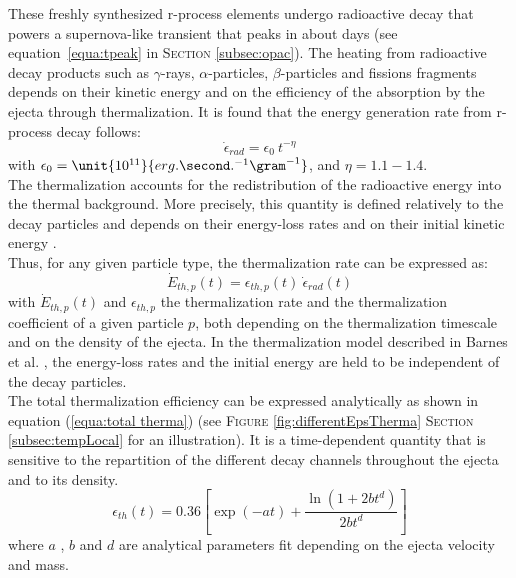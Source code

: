 \documentclass[a4paper, twoside, 11pt]{article}
\numberwithin{equation}{section}
\begin{document}
These freshly synthesized r-process elements undergo radioactive decay that powers a supernova-like transient that peaks in about days (see equation~\eqref{equa:tpeak} in S\textsc{ection} \ref{subsec:opac}). The heating from radioactive decay products such as $\gamma$-rays, $\alpha$-particles, $\beta$-particles and fissions fragments depends on their kinetic energy and on the efficiency of the absorption by the ejecta through thermalization. It is found that the energy generation rate from r-process decay follows\cite{Barnes_2016}: 
\begin{equation}
\dot{\epsilon}_{rad}= \epsilon_0\ t^{-\eta}
\label{equa:HeatingRate}
\end{equation} 
with \( \epsilon_0= \unit{10^{11}}{erg.\second.^{-1}\gram^{-1}}\), and \( \eta = 1.1-1.4\). \\

The thermalization  accounts for the redistribution of the radioactive energy into the thermal background. More precisely,  this quantity is defined relatively to the decay particles and  depends on their energy-loss rates and on their initial kinetic energy .\\

Thus, for any given particle type,  the thermalization rate can be expressed as: 
\begin{equation}
\dot{E}_{th,p}(t) = \epsilon_{th,p} (t) \  \dot{\epsilon}_{rad}(t)
\end{equation} 
with \( \dot{E}_{th,p}(t) \)  and \( \epsilon_{th,p}\) the thermalization rate and the thermalization coefficient of a given particle $p$, both depending on the thermalization timescale and on the density of the ejecta. In the thermalization model described in Barnes et al. \cite{Barnes_2016}, the energy-loss rates and the initial energy are held to be independent  of  the decay particles. \\

The total thermalization efficiency can be expressed analytically as shown in equation (\ref{equa:total therma}) (see  F\textsc{igure} \ref{fig:differentEpsTherma} S\textsc{ection} \ref{subsec:tempLocal} for an illustration).  It is a time-dependent quantity that is sensitive to the repartition of the different decay channels throughout the ejecta and to its density. 
\begin{equation}
\epsilon_{th}(t) = 0.36 \left[ \exp(-at) + \frac{\ln(1 + 2bt^{d})}{2bt^d}\right]
\label{equa:total therma}
\end{equation} 
where $a$ , $b$ and  $d$ are analytical parameters fit depending on the ejecta velocity and mass. 
\end{document}
